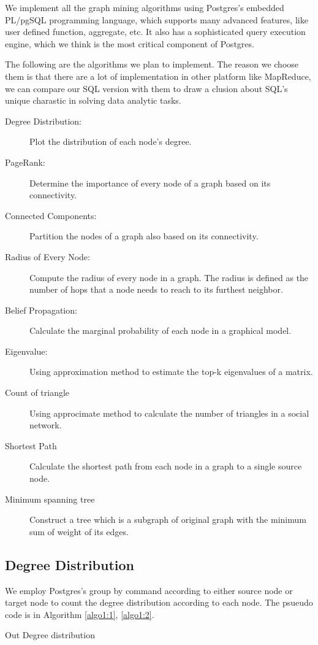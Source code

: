 We implement all the graph mining algorithms using Postgres's embedded PL/pgSQL programming language, which supports many advanced features, like user defined function, aggregate, etc. It also has a sophisticated query execution engine, which we think is the most critical component of Postgres.

The following are the algorithms we plan to implement. The reason we choose them is that there are a lot of implementation in other platform like MapReduce, we can compare our SQL version with them to draw a clusion about SQL's unique charastic in solving data analytic tasks.

\begin{description}
  \item[Degree Distribution:] Plot the distribution of each node's degree. 
  \item[PageRank:] Determine the importance of every node of a graph based on its connectivity. 
  \item[Connected Components:] Partition the nodes of a graph also based on its connectivity.
  \item[Radius of Every Node:] Compute the radius of every node in a graph. The radius is defined as the number of hops that a node needs to reach to its furthest neighbor.
  \item[Belief Propagation:] Calculate the marginal probability of each node in a graphical model. 
  \item[Eigenvalue:] Using approximation method to estimate the top-k eigenvalues of a matrix.
  \item[Count of triangle] Using approcimate method to calculate the number of triangles in a social network.
  \item[Shortest Path] Calculate the shortest path from each node in a graph to a single source node. 
  \item[Minimum spanning tree] Construct a tree which is a subgraph of original graph with the minimum sum of weight of its edges. 
\end{description}

\subsection{Degree Distribution}
We employ Postgres's group by command according to either source node or target node to count the degree distribution according to each node. The psueudo code is in Algorithm \ref{algo1:1}, \ref{algo1:2}.

\begin{algorithm}[!htbf]
\caption{Out Degree distribution}
\begin{algorithmic}
\end{algorithmic}
\label{algo1:1}
\end{algorithm}

